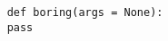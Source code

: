 \documentclass[12pt,letterpaper]{article}
\begin{document}
    \begin{verbatim}
    def boring(args = None):
    pass
    \end{verbatim}
\end{document}
